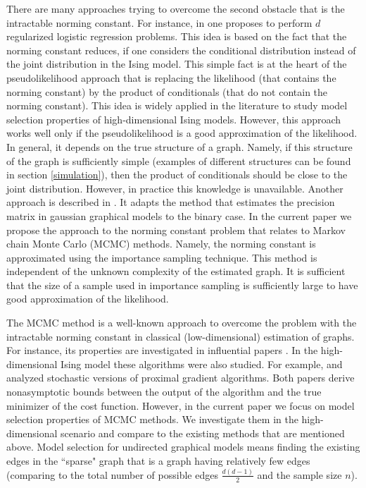 \documentclass[twoside,11pt]{article}
\begin{document}
There are many approaches trying to overcome the second obstacle that is the intractable norming constant. For instance, in \citet{Ravi10} one proposes to perform $d$ regularized logistic regression problems. This idea is based on the fact that the norming constant reduces, if one considers the conditional distribution instead of the joint distribution in the Ising model. 
This simple fact is at the heart of the pseudolikelihood approach \citep{Besag74} that is replacing the likelihood (that contains the norming constant) by the product of conditionals (that do not contain the norming constant). This idea is widely applied in the literature \citep{HofTib09,Guoetal10, Xueetal12, Jalali11} to study model selection properties of high-dimensional Ising models. However, this approach works well only if the pseudolikelihood is a good approximation of the likelihood. In general, it depends on the true structure of a graph. Namely, if this structure of the graph is sufficiently simple (examples of different structures can be found in section \ref{simulation}), then the product of conditionals should be close to the joint distribution. However, in practice this knowledge is unavailable. 
Another approach is described in \citet{banerjee08}. It adapts the method that estimates the precision matrix in gaussian graphical models to the binary case.
In the current paper we propose the  approach to the norming constant problem that relates to Markov chain Monte Carlo (MCMC) methods. 
Namely, the norming constant is approximated using the importance  
sampling technique. This method is independent of the unknown complexity of the estimated graph. 
It is sufficient that the size of a sample used in importance sampling is sufficiently large to have good approximation of the likelihood. 

The MCMC method is a well-known approach to overcome the problem with the intractable norming constant in classical (low-dimensional) estimation of graphs. 
For instance, its properties  are investigated in influential papers \citet{GeyerThompson92, Geyer94}.
In the high-dimensional Ising model these algorithms were also studied. 
For example, \citet{Honorio2012} and \citet{atchade2017Perturbed}  analyzed stochastic versions
of proximal gradient algorithms. Both papers derive nonasymptotic bounds between the output of the algorithm and the true minimizer of the cost function. 
However, in the current paper we focus on model selection properties of MCMC methods.
We investigate them 
in the high-dimensional
scenario and compare to the existing methods that are mentioned above.
Model selection for undirected graphical models means finding the existing edges in the ``sparse" graph that is a graph having relatively few edges (comparing to the total number of possible edges $\frac{d(d-1)}{2}$ and the sample size $n$).
\end{document}
